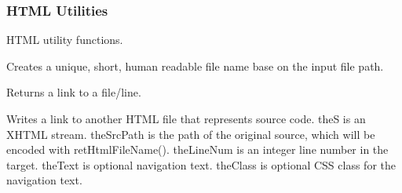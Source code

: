 \documentclass[letterpaper,10pt,english]{sphinxmanual}
\begin{document}
\subsubsection{HTML Utilities}
\label{\detokenize{ref/util/HtmlUtils:html-utilities}}\label{\detokenize{ref/util/HtmlUtils::doc}}\label{\detokenize{ref/util/HtmlUtils:module-TotalDepth.util.HtmlUtils}}
HTML utility functions.

\begin{fulllineitems}
\label{\detokenize{ref/util/HtmlUtils:TotalDepth.util.HtmlUtils.retHtmlFileName}}
Creates a unique, short, human readable file name base on the input
file path.

\end{fulllineitems}


\begin{fulllineitems}
\label{\detokenize{ref/util/HtmlUtils:TotalDepth.util.HtmlUtils.retHtmlFileLink}}
Returns a link to a file/line.

\end{fulllineitems}


\begin{fulllineitems}
\label{\detokenize{ref/util/HtmlUtils:TotalDepth.util.HtmlUtils.writeHtmlFileLink}}
Writes a link to another HTML file that represents source code.
theS is an XHTML stream.
theSrcPath is the path of the original source, which will be encoded with retHtmlFileName().
theLineNum is an integer line number in the target.
theText is optional navigation text.
theClass is optional CSS class for the navigation text.

\end{fulllineitems}

\end{document}
